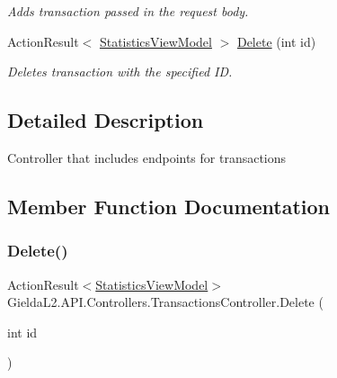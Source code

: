 \begin{DoxyCompactItemize}
\begin{DoxyCompactList}\small\item\em Adds transaction passed in the request body. \end{DoxyCompactList}\item 
Action\+Result$<$ \mbox{\hyperlink{class_gielda_l2_1_1_a_p_i_1_1_view_models_1_1_view_1_1_statistics_view_model}{Statistics\+View\+Model}} $>$ \mbox{\hyperlink{class_gielda_l2_1_1_a_p_i_1_1_controllers_1_1_transactions_controller_ac5a682f60f6aa6a9a1826233f4eb060b}{Delete}} (int id)
\begin{DoxyCompactList}\small\item\em Deletes transaction with the specified ID. \end{DoxyCompactList}\end{DoxyCompactItemize}


\subsection{Detailed Description}
Controller that includes endpoints for transactions 



\subsection{Member Function Documentation}
\mbox{\label{class_gielda_l2_1_1_a_p_i_1_1_controllers_1_1_transactions_controller_ac5a682f60f6aa6a9a1826233f4eb060b}} 
\subsubsection{\texorpdfstring{Delete()}{Delete()}}
{\footnotesize\ttfamily Action\+Result$<$\mbox{\hyperlink{class_gielda_l2_1_1_a_p_i_1_1_view_models_1_1_view_1_1_statistics_view_model}{Statistics\+View\+Model}}$>$ Gielda\+L2.\+A\+P\+I.\+Controllers.\+Transactions\+Controller.\+Delete (\begin{DoxyParamCaption}\item[{int}]{id }\end{DoxyParamCaption})}



